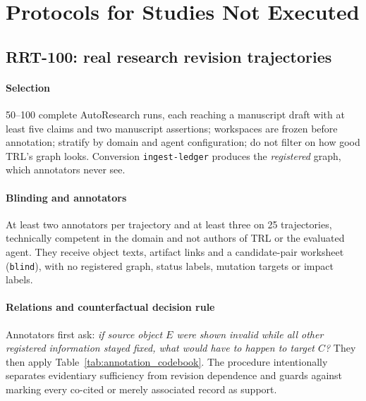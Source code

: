 \documentclass[journal]{IEEEtran}
\begin{document}
\section{Protocols for Studies Not Executed}
\subsection{RRT-100: real research revision trajectories}
\paragraph{Selection} 50--100 complete AutoResearch runs, each reaching a manuscript draft with at least five claims and two manuscript assertions; workspaces are frozen before annotation; stratify by domain and agent configuration; do not filter on how good TRL's graph looks. Conversion \texttt{ingest-ledger} produces the \emph{registered} graph, which annotators never see.
\paragraph{Blinding and annotators} At least two annotators per trajectory and at least three on 25 trajectories, technically competent in the domain and not authors of TRL or the evaluated agent. They receive object texts, artifact links and a candidate-pair worksheet (\texttt{blind}), with no registered graph, status labels, mutation targets or impact labels.
\paragraph{Relations and counterfactual decision rule} Annotators first ask: \emph{if source object $E$ were shown invalid while all other registered information stayed fixed, what would have to happen to target $C$?} They then apply Table~\ref{tab:annotation_codebook}. The procedure intentionally separates evidentiary sufficiency from revision dependence and guards against marking every co-cited or merely associated record as support.
\end{document}
